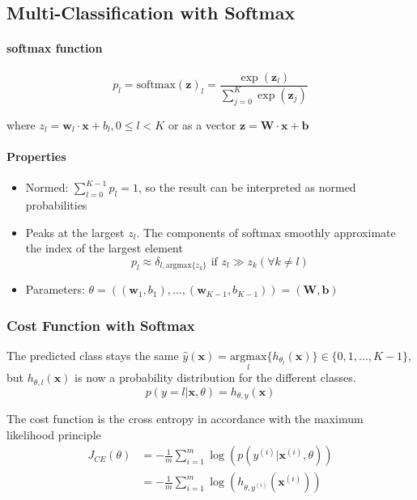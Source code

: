 \documentclass[11pt]{article}
\begin{document}
\subsection{Multi-Classification with Softmax}
\paragraph{softmax function}
\begin{equation*}
	p_l = \text{softmax}(\textbf{z})_l = \frac{\exp(\textbf{z}_l)}{\sum_{j=0}^{K}\exp(\textbf{z}_j)}
\end{equation*}

where $z_l = \textbf{w}_l\cdot\textbf{x} + b_l, 0\leq l < K$ or as a vector $ \textbf{z} = \textbf{W}\cdot\textbf{x} + \textbf{b}$

\paragraph{Properties}
\begin{itemize}
	\item Normed: $\sum_{l=0}^{K-1} p_l = 1$, so the result can be interpreted as normed probabilities
	\item Peaks at the largest $z_l$. The components of softmax smoothly approximate the index of the largest element\\
	$$ p_l \approx \delta_{l, \text{argmax}\{z_k\}}\text{ if } z_l \gg z_k(\forall k\neq l)$$
	\item Parameters: $ \theta = \left( (\textbf{w}_1,b_1), ..., (\textbf{w}_{K-1},b_{K-1}) \right) = (\textbf{W},\textbf{b}) $
\end{itemize}

\subsubsection{Cost Function with Softmax}
The predicted class stays the same $ \widehat{y}(\textbf{x}) = \underset{l}{\text{argmax}}\{h_{\theta_l}(\textbf{x})\} \in \{0,1,...,K-1\}$, but $h_{\theta, l}(\textbf{x})$ is now a probability distribution for the different classes.
\begin{equation*}
	p(y=l|\textbf{x},\theta) = h_{\theta, y}(\textbf{x})
\end{equation*}

The cost function is the cross entropy in accordance with the maximum likelihood principle
\begin{align*}
	J_{CE}(\theta) &= -\frac{1}{m}\sum_{i=1}^{m}\log\left( p(y^{(i)}|\textbf{x}^{(i)}, \theta) \right)\\
	&= -\frac{1}{m}\sum_{i=1}^{m}\log\left( h_{\theta, y^{(i)}}(\textbf{x}^{(i)}) \right)
\end{align*}
\end{document}
